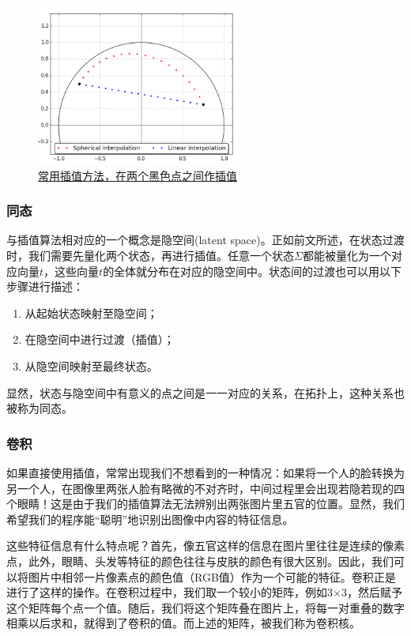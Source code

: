 \documentclass[UTF8,a4paper，12pt]{article}
\theoremstyle{theorem}
\theoremstyle{definition}
\begin{document}
\begin{figure}[htbp]
	\centering
	\includegraphics[width=0.6\textwidth]{assets/02}
	\caption{\href{https://devblogs.nvidia.com/photo-editing-generative-adversarial-networks-1}{常用插值方法，在两个黑色点之间作插值}}
\end{figure}

\subsubsection{同态}

与插值算法相对应的一个概念是隐空间(latent space)。正如前文所述，在状态过渡时，我们需要先量化两个状态，再进行插值。任意一个状态$\Sigma$都能被量化为一个对应向量$t$，这些向量$t$的全体就分布在对应的隐空间中。状态间的过渡也可以用以下步骤进行描述：
\begin{enumerate}
	\item 从起始状态映射至隐空间；
	\item 在隐空间中进行过渡（插值）；
	\item 从隐空间映射至最终状态。
\end{enumerate}

显然，状态与隐空间中有意义的点之间是一一对应的关系，在拓扑上，这种关系也被称为同态。

\subsubsection{卷积}

如果直接使用插值，常常出现我们不想看到的一种情况：如果将一个人的脸转换为另一个人，在图像里两张人脸有略微的不对齐时，中间过程里会出现若隐若现的四个眼睛！这是由于我们的插值算法无法辨别出两张图片里五官的位置。显然，我们希望我们的程序能“聪明”地识别出图像中内容的特征信息。

这些特征信息有什么特点呢？首先，像五官这样的信息在图片里往往是连续的像素点，此外，眼睛、头发等特征的颜色往往与皮肤的颜色有很大区别。因此，我们可以将图片中相邻一片像素点的颜色值（RGB值）作为一个可能的特征。卷积正是进行了这样的操作。在卷积过程中，我们取一个较小的矩阵，例如3×3，然后赋予这个矩阵每个点一个值。随后，我们将这个矩阵叠在图片上，将每一对重叠的数字相乘以后求和，就得到了卷积的值。而上述的矩阵，被我们称为卷积核。
\end{document}
